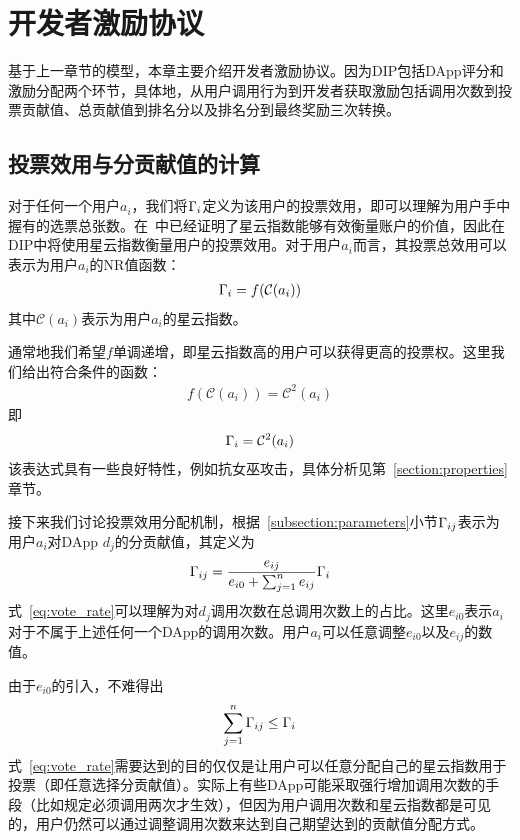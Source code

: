 \section{开发者激励协议}
基于上一章节的模型，本章主要介绍开发者激励协议。因为DIP包括DApp评分和激励分配两个环节，具体地，从用户调用行为到开发者获取激励包括调用次数到投票贡献值、总贡献值到排名分以及排名分到最终奖励三次转换。

\subsection{投票效用与分贡献值的计算}
对于任何一个用户$a_i$，我们将$\Gamma_i$定义为该用户的投票效用，即可以理解为用户手中握有的选票总张数。在~\cite{Nebulasyellowpaper}中已经证明了星云指数能够有效衡量账户的价值，因此在DIP中将使用星云指数衡量用户的投票效用。对于用户$a_i$而言，其投票总效用可以表示为用户$a_i$的NR值函数：
\begin{align}
\Gamma_i = f(\mathcal{C}(a_i))
\end{align}
其中$\mathcal{C}(a_i)$表示为用户$a_i$的星云指数。

通常地我们希望$f$单调递增，即星云指数高的用户可以获得更高的投票权。这里我们给出符合条件的函数：
\begin{align}
f(\mathcal{C}(a_i))=\mathcal{C}^2(a_i)
\end{align}
即
\begin{align}
\Gamma_i = \mathcal{C}^2(a_i)
\end{align}
该表达式具有一些良好特性，例如抗女巫攻击，具体分析见第~\ref{section:properties}章节。

接下来我们讨论投票效用分配机制，根据~\ref{subsection:parameters}小节$\Gamma_{ij}$表示为用户$a_i$对DApp $d_j$的分贡献值，其定义为
\begin{align}
\label{eq:vote_rate}
\Gamma_{ij} = \frac{e_{ij}}{e_{i0}+\sum_{j=1}^n {e_{ij}}} \Gamma_i
\end{align}
式~\ref{eq:vote_rate}可以理解为对$d_j$调用次数在总调用次数上的占比。这里$e_{i0}$表示$a_i$对于不属于上述任何一个DApp的调用次数。用户$a_i$可以任意调整$e_{i0}$以及$e_{ij}$的数值。

由于$e_{i0}$的引入，不难得出
$$\sum_{j=1}^n \Gamma_{ij} \leq \Gamma_i$$
\noindent 式~\ref{eq:vote_rate}需要达到的目的仅仅是让用户可以任意分配自己的星云指数用于投票（即任意选择分贡献值）。实际上有些DApp可能采取强行增加调用次数的手段（比如规定必须调用两次才生效），但因为用户调用次数和星云指数都是可见的，用户仍然可以通过调整调用次数来达到自己期望达到的贡献值分配方式。

